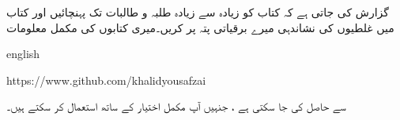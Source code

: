  گزارش  کی جاتی ہے کہ   کتاب کو زیادہ سے زیادہ طلبہ و طالبات تک پہنچائیں اور کتاب میں غلطیوں کی نشاندہی میرے  برقیاتی پتہ      پر کریں۔میری  کتابوں کی مکمل  معلومات
 
{
\begin{otherlanguage*}{english}
\begin{LTR}
https:/\!\!/www.github.com/khalidyousafzai
\end{LTR}
\end{otherlanguage*}
}
سے حاصل کی جا سکتی ہے ، جنہیں آپ مکمل اختیار کے ساتھ استعمال کر سکتے ہیں۔

\vspace{5mm}

{}
